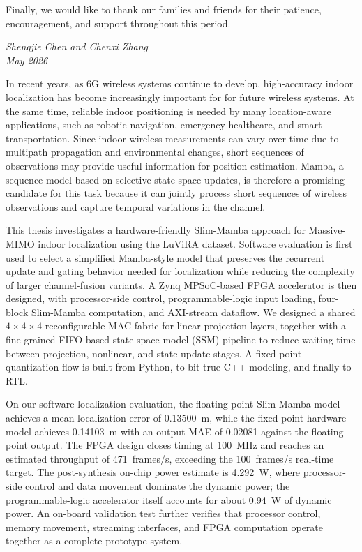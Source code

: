\documentclass[11pt,twoside]{eitExjobb}
\makeatletter
\renewcommand\chapter{\clearpage\sh@chapter}
\makeatother
\begin{document}
Finally, we would like to thank our families and friends for their patience, encouragement, and support throughout this period.
\begin{center}
\textit{Shengjie Chen and Chenxi Zhang}\\
\textit{May 2026}
\end{center}
\chapter*{Abstract}
In recent years, as 6G wireless systems continue to develop, high-accuracy indoor
localization has become increasingly important for for future
wireless systems. At the same time, reliable indoor positioning is needed by many location-aware
applications, such as robotic navigation, emergency healthcare, and smart
transportation. Since indoor wireless measurements can vary over time due to
multipath propagation and environmental changes, short sequences of observations may
provide useful information for position estimation. Mamba, a sequence model based on
selective state-space updates, is therefore a promising candidate for this task because 
it can jointly process short sequences of wireless observations and
capture temporal variations in the channel.

This thesis investigates a hardware-friendly Slim-Mamba approach for Massive-MIMO indoor
localization using the LuViRA dataset. Software evaluation is first used to select a
simplified Mamba-style model that preserves the recurrent update and gating behavior
needed for localization while reducing the complexity of larger channel-fusion variants.
A Zynq MPSoC-based FPGA accelerator is then designed, with processor-side control, programmable-logic input loading, four-block Slim-Mamba computation, and AXI-stream dataflow. 
We designed a shared \(4\times4\times4\) reconfigurable MAC
fabric for linear projection layers, together with a fine-grained
FIFO-based state-space model (SSM) pipeline to reduce waiting time between projection, nonlinear, and
state-update stages. A fixed-point quantization flow is built from Python, to bit-true
C++ modeling, and finally to RTL. 

On our software localization evaluation, the floating-point Slim-Mamba model
achieves a mean localization error of 0.13500~m, while the fixed-point hardware model
achieves 0.14103~m with an output MAE of 0.02081 against the floating-point output.
The FPGA design closes timing at 100~MHz and reaches an estimated throughput of
471~frames/s, exceeding the 100~frames/s real-time target. The post-synthesis
on-chip power estimate is 4.292~W, where processor-side control and data
movement dominate the dynamic power; the programmable-logic accelerator itself
accounts for about 0.94~W of dynamic power. An on-board validation test further
verifies that processor control, memory movement, streaming interfaces, and FPGA
computation operate together as a complete prototype system.
\end{document}
